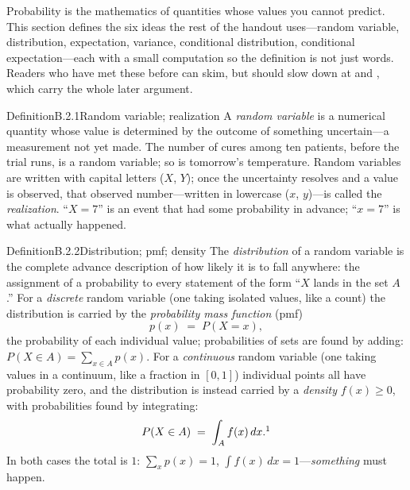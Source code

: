 \documentclass[main.tex]{subfiles}
\begin{document}

Probability is the mathematics of quantities whose values you cannot predict. This section
defines the six ideas the rest of the handout uses---random variable, distribution,
expectation, variance, conditional distribution, conditional expectation---each with a small
computation so the definition is not just words. Readers who have met these before can skim,
but should slow down at  and , which carry the whole later argument.

\begin{Obj}{Definition}{B.2.1}{Random variable; realization}
A \emph{random variable} is a numerical quantity whose value is determined by the outcome of
something uncertain---a measurement not yet made. The number of cures among ten patients,
before the trial runs, is a random variable; so is tomorrow's temperature. Random variables
are written with capital letters ($X$, $Y$); once the uncertainty resolves and a value is
observed, that observed number---written in lowercase ($x$, $y$)---is called the
\emph{realization}. ``$X=7$'' is an event that had some probability in advance; ``$x=7$'' is
what actually happened.
\end{Obj}

\begin{Obj}{Definition}{B.2.2}{Distribution; pmf; density}
The \emph{distribution} of a random variable is the complete advance description of how
likely it is to fall anywhere: the assignment of a probability to every statement of the
form ``$X$ lands in the set $A$.'' For a \emph{discrete} random variable (one taking
isolated values, like a count) the distribution is carried by the \emph{probability mass
function} (pmf)
\[ p(x) \;=\; P(X = x) , \]
the probability of each individual value; probabilities of sets are found by adding:
$P(X\in A)=\sum_{x\in A}p(x)$. For a \emph{continuous} random variable (one taking values in
a continuum, like a fraction in $[0,1]$) individual points all have probability zero, and
the distribution is instead carried by a \emph{density} $f(x)\ge0$, with probabilities found
by integrating:
\[ P(X\in A) \;=\; \int_A f(x)\,dx .\note{A density is not a probability but a probability
\emph{rate}: probability per unit length, so that $f(x)\,dx\approx P(x\le X\le x+dx)$ for
small $dx$. Consequently a density can exceed $1$ (the uniform density on $[0,\frac12]$ is
$2$ there) and $f(x)$ is emphatically not $P(X=x)$, which is $0$. Sums against a pmf and
integrals against a density are the same idea with the same rules; the handout states things
once and trusts the reader to swap $\sum\leftrightarrow\int$.} \]
In both cases the total is $1$: $\sum_x p(x)=1$, $\int f(x)\,dx=1$---\emph{something} must
happen.
\end{Obj}
\end{document}
